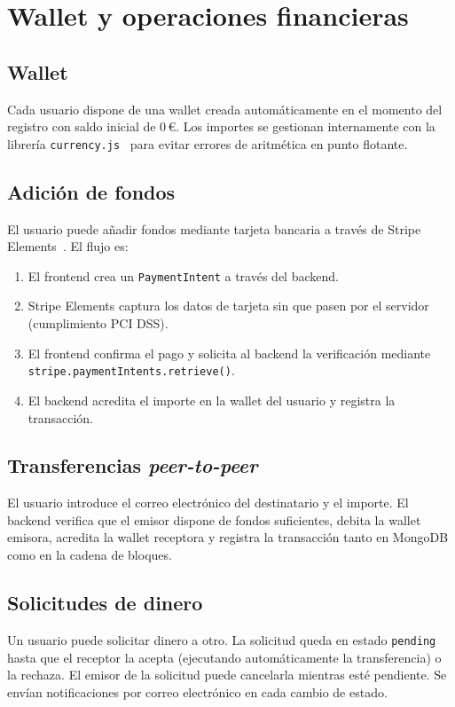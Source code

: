 \section{Wallet y operaciones financieras}

\subsection{Wallet}
Cada usuario dispone de una wallet creada automáticamente en el momento del registro con saldo inicial de 0\,\euro{}. Los importes se gestionan internamente con la librería \texttt{currency.js}~\cite{currencyjs} para evitar errores de aritmética en punto flotante.

\subsection{Adición de fondos}
El usuario puede añadir fondos mediante tarjeta bancaria a través de Stripe Elements~\cite{stripe}. El flujo es:

\begin{enumerate}
  \item El frontend crea un \texttt{PaymentIntent} a través del backend.
  \item Stripe Elements captura los datos de tarjeta sin que pasen por el servidor (cumplimiento PCI DSS).
  \item El frontend confirma el pago y solicita al backend la verificación mediante \texttt{stripe.paymentIntents.retrieve()}.
  \item El backend acredita el importe en la wallet del usuario y registra la transacción.
\end{enumerate}

\subsection{Transferencias \emph{peer-to-peer}}
El usuario introduce el correo electrónico del destinatario y el importe. El backend verifica que el emisor dispone de fondos suficientes, debita la wallet emisora, acredita la wallet receptora y registra la transacción tanto en MongoDB como en la cadena de bloques.

\subsection{Solicitudes de dinero}
Un usuario puede solicitar dinero a otro. La solicitud queda en estado \texttt{pending} hasta que el receptor la acepta (ejecutando automáticamente la transferencia) o la rechaza. El emisor de la solicitud puede cancelarla mientras esté pendiente. Se envían notificaciones por correo electrónico en cada cambio de estado.

